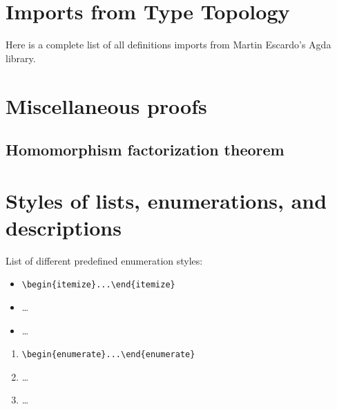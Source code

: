 \documentclass[a4paper,USenglish,cleveref,autoref,thm-restate]{lipics-v2019}
\begin{document}

\appendix

\section{Imports from Type Topology}\label{sec:imports-from-type-topology}
Here is a complete list of all definitions \agdaualib imports from Martin Escardo's \typetopology Agda library.
\begin{code}  \end{code}

\section{Miscellaneous proofs}\label{sec:appendix-miscproofs}
\subsection{Homomorphism factorization theorem}\label{sec:appendix-homfactor}
\begin{code}\end{code}



\section{Styles of lists, enumerations, and descriptions}\label{sec:itemStyles}
List of different predefined enumeration styles:

\begin{itemize}
\item \verb|\begin{itemize}...\end{itemize}|
\item \dots
\item \dots
\end{itemize}

\begin{enumerate}
\item \verb|\begin{enumerate}...\end{enumerate}|
\item \dots
\item \dots
\end{enumerate}
\end{document}
